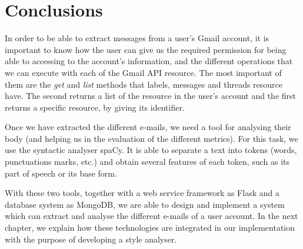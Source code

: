 \section{Conclusions}
In order to be able to extract messages from a user's Gmail account, it is important to know how the user can give us the required permission for being able to accessing to the account's information, and the different operations that we can execute with each of the Gmail API resource. The most important of them are the \textit{get} and \textit{list} methods that labels, messages and threads resource have. The second returns a list of the resource in the user's account and the first returns a specific resource, by giving its identifier.

Once we have extracted the different e-mails, we need a tool for analysing their body (and helping us in the evaluation of the different metrics). For this task, we use the syntactic analyser spaCy. It is able to separate a text into tokens (words, punctuations marks, etc.) and obtain several features of each token, such as its part of speech or its base form.

With these two tools, together with a web service framework as Flask and a database system as MongoDB, we are able to design and implement a system which can extract and analyse the different e-mails of a user account. In the next chapter, we explain how these technologies are integrated in our implementation with the purpose of developing a style analyser.